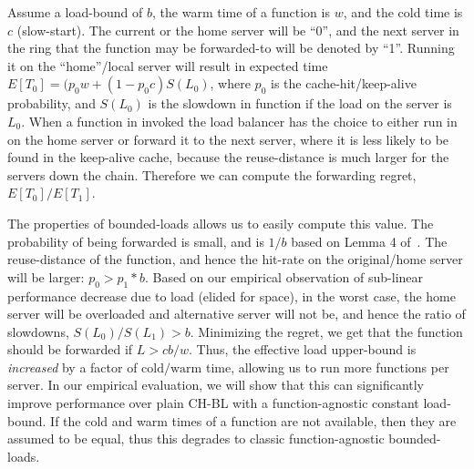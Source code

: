 

Assume a load-bound of $b$, the warm time of a function is $w$, and the cold time is $c$ (slow-start). 
%
The current or the home server will be ``0'', and the next server in the ring that the function may be forwarded-to will be denoted by ``1''. 
Running it on the ``home''/local server will result in expected time $E[T_0] = (p_0w+(1-p_0c)S(L_0) $, where $p_0$ is the cache-hit/keep-alive probability, and $S(L_0)$ is the slowdown in function if the load on the server is $L_0$. 
When a function in invoked the load balancer has the choice to either run in on the home server or forward it to the next server, where it is less likely to be found in the keep-alive cache, because the reuse-distance is much larger for the servers down the chain.
Therefore we can compute the forwarding regret, $E[T_0]/E[T_1]$.

The properties of bounded-loads allows us to easily compute this value.
The probability of being forwarded is small, and is $1/b$ based on Lemma 4 of~\cite{mirrokni2018consistent}.
The reuse-distance of the function, and hence the hit-rate on the original/home server will be larger: $p_0 > p_1*b$. 
Based on our empirical observation of sub-linear performance decrease due to load (elided for space), in the worst case, the home server will be overloaded and alternative server will not be, and hence the ratio of slowdowns, $S(L_0)/S(L_1) > b$.
%
Minimizing the regret, we get that the function should be forwarded if $L>cb/w$.
Thus, the effective load upper-bound is \emph{increased} by a factor of $\text{cold}/\text{warm}$  time, allowing us to run more functions per server. 
In our empirical evaluation, we will show that this can significantly improve performance over plain CH-BL with a function-agnostic constant load-bound.
If the cold and warm times of a function are not available, then they are assumed to be equal, thus this degrades to classic function-agnostic bounded-loads. 


